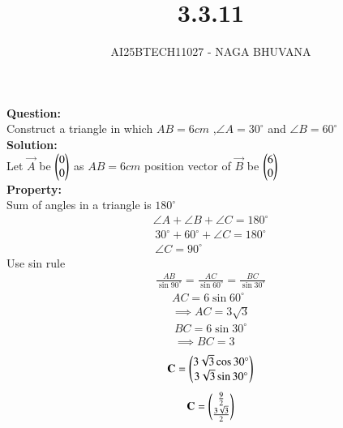 \documentclass[journal,12pt,onecolumn]{IEEEtran}
\begin{document}
\title{3.3.11}
\author{AI25BTECH11027 - NAGA BHUVANA}
{\let\newpage\relax\maketitle}
\noindent
		\textbf{Question:}\\
Construct a triangle in which $AB=6cm$ ,$\angle A=30^\circ$ and $\angle B=60^\circ$\\
\textbf{Solution:}\\
Let $\vec{A}$ be $\begin{pmatrix}0\\0\end{pmatrix}$ as $AB=6 cm$ position vector of $\vec{B}$ be $\begin{pmatrix}6\\0\end{pmatrix}$\\
\textbf{Property:}\\
Sum of angles in a triangle is $180^\circ$\\
\begin{align}
    \angle A+\angle B+\angle C=180^\circ
\end{align}
\begin{align}
    30^\circ+60^\circ+\angle C=180^\circ\\
    \angle C=90^\circ
\end{align}
Use sin rule\\
\begin{align}
    \frac{AB}{\sin 90^\circ}=\frac{AC}{\sin 60^\circ}=\frac{BC}{\sin 30^\circ}
\end{align}
       \begin{align}
           AC=6\sin 60^\circ\\
         \implies  AC=3\sqrt{3}
       \end{align} 
\begin{align}
    BC=6\sin 30^\circ\\
    \implies BC=3
\end{align}
\begin{align}
    \mathbf{C}=\begin{pmatrix}3\sqrt{3} \cos 30^\circ\\3\sqrt{3} \sin 30^\circ\end{pmatrix}
\end{align}       
\begin{align}
    \mathbf{C}=\begin{pmatrix}\frac{9}{2}\\ \frac{3\sqrt{3}}{2}\end{pmatrix}
\end{align}
\end{document}
